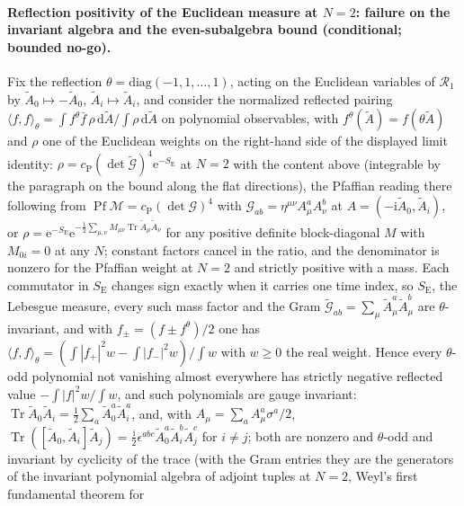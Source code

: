 \paragraph{Reflection positivity of the Euclidean measure at \(N=2\): failure on the
invariant algebra and the even-subalgebra bound (conditional; bounded no-go).}
Fix the reflection \(\theta=\mathrm{diag}(-1,1,\dots,1)\), acting on the Euclidean
variables of \(\mathcal R_1\) by \(\tilde A_0\mapsto-\tilde A_0\),
\(\tilde A_i\mapsto\tilde A_i\), and consider the normalized reflected pairing
\(\langle f,f\rangle_\theta=\int f^\theta\bar f\,\rho\,\mathrm d\tilde A\big/
\int\rho\,\mathrm d\tilde A\) on polynomial observables, with
\(f^\theta(\tilde A)=f(\theta\tilde A)\) and \(\rho\) one of the Euclidean weights on
the right-hand side of the displayed limit identity: \(\rho=c_{\mathrm P}
(\det\tilde{\mathcal G})^4\mathrm e^{-S_{\mathrm E}}\) at \(N=2\) with the content
above (integrable by the paragraph on the bound along the flat directions), the
Pfaffian reading there following from \(\operatorname{Pf}\mathcal M=c_{\mathrm P}
(\det\mathcal G)^4\) with \(\mathcal G_{ab}=\eta^{\mu\nu}A^a_\mu A^b_\nu\) at
\(A=(-\mathrm i\tilde A_0,\tilde A_i)\), or \(\rho=\mathrm e^{-S_{\mathrm E}}\mathrm
e^{-\frac12\sum_{\mu,\nu}M_{\mu\nu}\operatorname{Tr}\tilde A_\mu\tilde A_\nu}\) for
any positive definite block-diagonal \(M\) with \(M_{0i}=0\) at any \(N\); constant
factors cancel in the ratio, and the denominator is nonzero for the Pfaffian weight
at \(N=2\) and strictly positive with a mass. Each commutator in \(S_{\mathrm E}\)
changes sign exactly when it carries one time index, so \(S_{\mathrm E}\), the
Lebesgue measure, every such mass factor and the Gram
\(\tilde{\mathcal G}_{ab}=\sum_\mu\tilde A^a_\mu\tilde A^b_\mu\) are
\(\theta\)-invariant, and with \(f_\pm=(f\pm f^\theta)/2\) one has
\(\langle f,f\rangle_\theta=(\int|f_+|^2w-\int|f_-|^2w)/\int w\) with \(w\ge0\) the
real weight. Hence every \(\theta\)-odd polynomial not vanishing almost everywhere
has strictly negative reflected value \(-\int|f|^2w/\int w\), and such polynomials
are gauge invariant: \(\operatorname{Tr}\tilde A_0\tilde A_i=
\frac12\sum_a\tilde A^a_0\tilde A^a_i\), and, with
\(A_\mu=\sum_aA^a_\mu\sigma^a/2\), \(\operatorname{Tr}([\tilde A_0,\tilde A_i]
\tilde A_j)=\frac{\mathrm i}2\epsilon^{abc}\tilde A^a_0\tilde A^b_i\tilde A^c_j\) for
\(i\ne j\); both are nonzero and \(\theta\)-odd and invariant by cyclicity of the
trace (with the Gram entries they are the generators of the invariant polynomial
algebra of adjoint tuples at \(N=2\), Weyl's first fundamental theorem for
